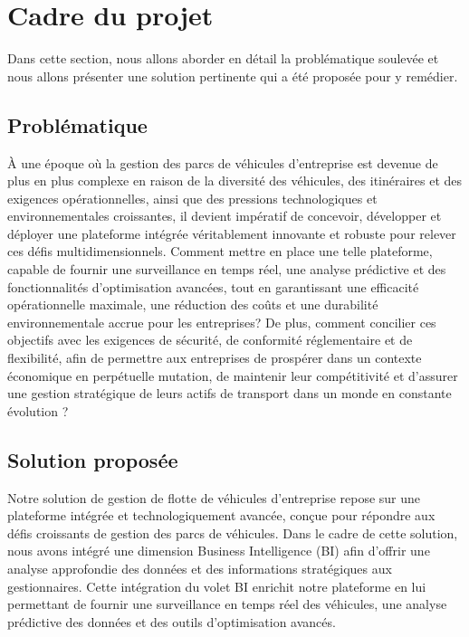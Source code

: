 \section{Cadre du projet}
\bigskip
Dans cette section, nous allons aborder en détail la problématique soulevée et nous allons présenter une solution pertinente qui a été proposée pour y remédier.
\bigskip
\subsection{ Problématique}
\bigskip
À une époque où la gestion des parcs de véhicules d'entreprise est devenue de plus en plus complexe en raison de la diversité des véhicules, des itinéraires et des exigences opérationnelles, ainsi que des pressions technologiques et environnementales croissantes, il devient impératif de concevoir, développer et déployer une plateforme intégrée véritablement innovante et robuste pour relever ces défis multidimensionnels. Comment mettre en place une telle plateforme, capable de fournir une surveillance en temps réel, une analyse prédictive et des fonctionnalités d'optimisation avancées, tout en garantissant une efficacité opérationnelle maximale, une réduction des coûts et une durabilité environnementale accrue pour les entreprises? De plus, comment concilier ces objectifs avec les exigences de sécurité, de conformité réglementaire et de flexibilité, afin de permettre aux entreprises de prospérer dans un contexte économique en perpétuelle mutation, de maintenir leur compétitivité et d'assurer une gestion stratégique de leurs actifs de transport dans un monde en constante évolution ?




\subsection{ Solution proposée}
\bigskip
Notre solution de gestion de flotte de véhicules d’entreprise repose sur une plateforme intégrée et technologiquement avancée, conçue pour répondre aux défis croissants de gestion des parcs de véhicules. Dans le cadre de cette solution, nous avons intégré une dimension Business Intelligence (BI) afin d'offrir une analyse approfondie des données et des informations stratégiques aux gestionnaires. Cette intégration du volet BI enrichit notre plateforme en lui permettant de fournir une surveillance en temps réel des véhicules, une analyse prédictive des données et des outils d'optimisation avancés.

